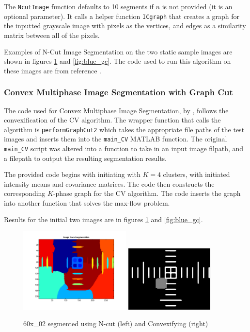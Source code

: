 \documentclass{article}
\begin{document}
The \texttt{NcutImage} function defaults to 10 segments if $n$ is not provided (it is an optional parameter). It calls a helper function \texttt{ICgraph} that creates a graph for the inputted grayscale image with pixels as the vertices, and edges as a similarity matrix between all of the pixels.


Examples of N-Cut Image Segmentation on the two static sample images are shown in figures \ref{fig:60x_02_gc} and \ref{fig:blue_gc}. The code used to run this algorithm on these images are from reference \cite{ncut_code}.






\subsubsection*{Convex Multiphase Image Segmentation with Graph Cut}

 The code used for Convex Multiphase Image Segmentation, by \cite{jun}, follows the convexification of the CV algorithm. The wrapper function that calls the algorithm is \texttt{performGraphCut2} which takes the appropriate file paths of the test images and inserts them into the \texttt{main\_CV} MATLAB function. The original \texttt{main\_CV} script was altered into a function to take in an input image filpath, and a filepath to output the resulting segmentation results.

The provided code begins with initiating with $K=4$ clusters, with initiated intensity means and covariance matrices. The code then constructs the corresponding $K$-phase graph for the CV algorithm. The code inserts the graph into another function that solves the max-flow problem.

Results for the initial two images are in figures \ref{fig:60x_02_gc} and \ref{fig:blue_gc}.

\pagebreak



\begin{figure}
\centering
\includegraphics[width=0.5\textwidth]{figures/60x_02_gc1.pdf}
\includegraphics[width=0.4\textwidth]{figures/60x_02_gc2.png}
\caption{60x\_02 segmented using N-cut (left) and Convexifying (right)}
\label{fig:60x_02_gc}
\end{figure}
\end{document}
